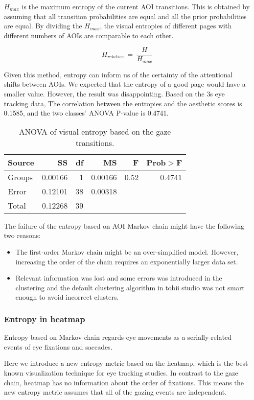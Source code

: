 $H_{max}$ is the maximum entropy of the current AOI transitions. This is obtained by assuming that all transition probabilities are equal and all the prior probabilities are equal.
By dividing the $H_{max}$, the visual entropies of different pages with different numbers of AOIs are comparable to each other.

$$H_{relative}~=~\frac{H}{H_{max}}$$

Given this method, entropy can inform us of the certainty of the attentional shifts between AOIs. We expected that the entropy of a good page would have a smaller value. However, the result was disappointing. Based on the 3s eye tracking data, The correlation between the entropies and the aesthetic scores is 0.1585, and the two classes' ANOVA P-value is 0.4741.

\begin{table}[H]
\begin{tabular}{lrrrrr}
  Source&SS&df&MS&F&Prob$>$F\\ \hline
  Groups&0.00166&1&0.00166&0.52&0.4741\\
  Error&0.12101&38&0.00318&&\\
  Total&0.12268&39&&&\\
\end{tabular}
\caption{ANOVA of visual entropy based on the gaze transitions.}
\label{tab:ANOVA-ve}
\end{table}

The failure of the entropy based on AOI Markov chain might have the following two reasons:
\begin{itemize}
  \item The first-order Markov chain might be an over-simplified model. However, increasing the order of the chain requires an exponentially larger data set.
  \item Relevant information was lost and some errors was introduced in the clustering and the default clustering algorithm in tobii studio was not smart enough to avoid incorrect clusters.
\end{itemize}

\subsubsection{Entropy in heatmap}
Entropy based on Markov chain regards eye movements as a serially-related events of eye fixations and saccades.

Here we introduce a new entropy metric based on the heatmap, which is the best-known visualization technique for eye tracking studies\cite{Nielsen2010}. In contrast to the gaze chain, heatmap has no information about the order of fixations. This means the new entropy metric assumes that all of the gazing events are independent.

